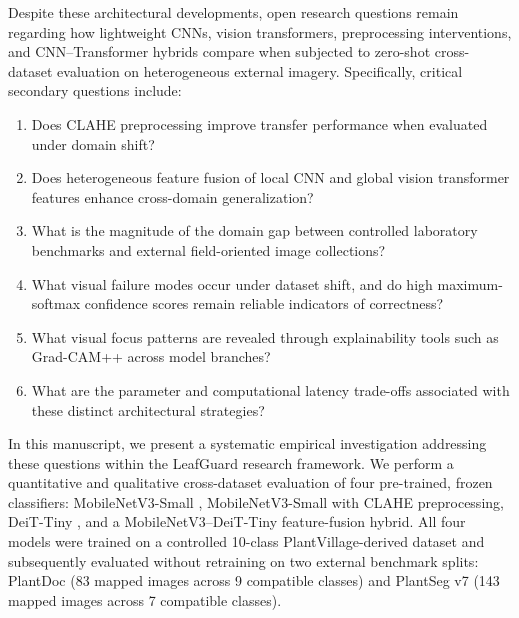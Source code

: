 \documentclass[10pt,journal,compsoc]{IEEEtran}
\begin{document}
Despite these architectural developments, open research questions remain regarding how lightweight CNNs, vision transformers, preprocessing interventions, and CNN--Transformer hybrids compare when subjected to zero-shot cross-dataset evaluation on heterogeneous external imagery. Specifically, critical secondary questions include:
\begin{enumerate}
    \item Does CLAHE preprocessing improve transfer performance when evaluated under domain shift?
    \item Does heterogeneous feature fusion of local CNN and global vision transformer features enhance cross-domain generalization?
    \item What is the magnitude of the domain gap between controlled laboratory benchmarks and external field-oriented image collections?
    \item What visual failure modes occur under dataset shift, and do high maximum-softmax confidence scores remain reliable indicators of correctness?
    \item What visual focus patterns are revealed through explainability tools such as Grad-CAM++ across model branches?
    \item What are the parameter and computational latency trade-offs associated with these distinct architectural strategies?
\end{enumerate}

In this manuscript, we present a systematic empirical investigation addressing these questions within the LeafGuard research framework. We perform a quantitative and qualitative cross-dataset evaluation of four pre-trained, frozen classifiers: MobileNetV3-Small \cite{howard2019}, MobileNetV3-Small with CLAHE preprocessing, DeiT-Tiny \cite{touvron2021}, and a MobileNetV3--DeiT-Tiny feature-fusion hybrid. All four models were trained on a controlled 10-class PlantVillage-derived dataset and subsequently evaluated without retraining on two external benchmark splits: PlantDoc \cite{singh2020} (83 mapped images across 9 compatible classes) and PlantSeg v7 \cite{aitmagdalene2024} (143 mapped images across 7 compatible classes).
\end{document}

